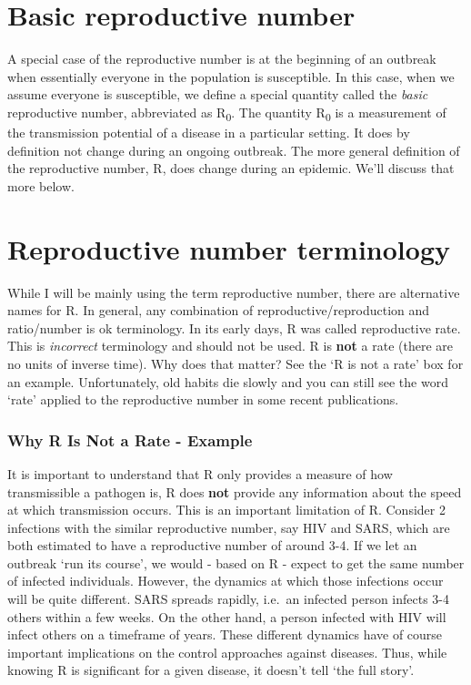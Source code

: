 \documentclass[]{book}
\theoremstyle{definition}
\theoremstyle{definition}
\theoremstyle{definition}
\theoremstyle{remark}
\begin{document}
\hypertarget{basic-reproductive-number}{%
\section{Basic reproductive number}\label{basic-reproductive-number}}

A special case of the reproductive number is at the beginning of an
outbreak when essentially everyone in the population is susceptible. In
this case, when we assume everyone is susceptible, we define a special
quantity called the \emph{basic} reproductive number, abbreviated as
R\textsubscript{0}. The quantity R\textsubscript{0} is a measurement of
the transmission potential of a disease in a particular setting. It does
by definition not change during an ongoing outbreak. The more general
definition of the reproductive number, R, does change during an
epidemic. We'll discuss that more below.

\hypertarget{reproductive-number-terminology}{%
\section{Reproductive number
terminology}\label{reproductive-number-terminology}}

While I will be mainly using the term reproductive number, there are
alternative names for R. In general, any combination of
reproductive/reproduction and ratio/number is ok terminology. In its
early days, R was called reproductive rate. This is \emph{incorrect}
terminology and should not be used. R is \textbf{not} a rate (there are
no units of inverse time). Why does that matter? See the `R is not a
rate' box for an example. Unfortunately, old habits die slowly and you
can still see the word `rate' applied to the reproductive number in some
recent publications.

\hypertarget{myexamplebox}{%
\subsubsection{Why R Is Not a Rate - Example}\label{myexamplebox}}

It is important to understand that R only provides a measure of how
transmissible a pathogen is, R does \textbf{not} provide any information
about the speed at which transmission occurs. This is an important
limitation of R. Consider 2 infections with the similar reproductive
number, say HIV and SARS, which are both estimated to have a
reproductive number of around 3-4. If we let an outbreak `run its
course', we would - based on R - expect to get the same number of
infected individuals. However, the dynamics at which those infections
occur will be quite different. SARS spreads rapidly, i.e.~an infected
person infects 3-4 others within a few weeks. On the other hand, a
person infected with HIV will infect others on a timeframe of years.
These different dynamics have of course important implications on the
control approaches against diseases. Thus, while knowing R is
significant for a given disease, it doesn't tell `the full story'.
\end{document}
